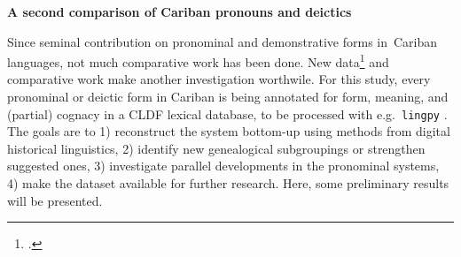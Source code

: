 \documentclass[a4paper]{article}
\begin{document}
	\begin{center}
		\bfseries
		\large{A second comparison of Cariban pronouns and deictics}\\
		\vspace{.05cm}
		\vspace{.1cm}
		\normalfont

	\end{center}
	\vspace{.4cm}
	

Since  seminal contribution on pronominal and demonstrative forms in Cariban languages, not much comparative work has been done.
New data\footnote{\textcites{ikpengpacheco2001}{akawaiocaesar2003}{mattei2003pemono}{cruz2005fonologia}{garcia2006diccionario}{kuikurodossantos2007}{kuikurodossantos2007}{camargo2010wayana}{desouza2010arara}{swiggers2010gramatica}{largo2011yukpa}{maquiritaricaceres2011}{panarepayne2013}{stegeman2014akawaio}{alves2017arara}{guerrero2019carijo}{muller2021yawarana}.} and comparative work \parencites{meira2005southern}{meira2010origin} make another investigation worthwile.
For this study, every pronominal or deictic form in Cariban is being annotated for form, meaning, and (partial) cognacy in a CLDF \parencite{cldf2017} lexical database, to be processed with e.g.\ \texttt{lingpy} \parencite{lingpy268}.
The goals are to 1) reconstruct the \PC system bottom-up using methods from digital historical linguistics, 2) identify new genealogical subgroupings or strengthen suggested ones, 3) investigate parallel developments in the pronominal systems, 4) make the dataset available for further research.
Here, some preliminary results will be presented.
\end{document}
